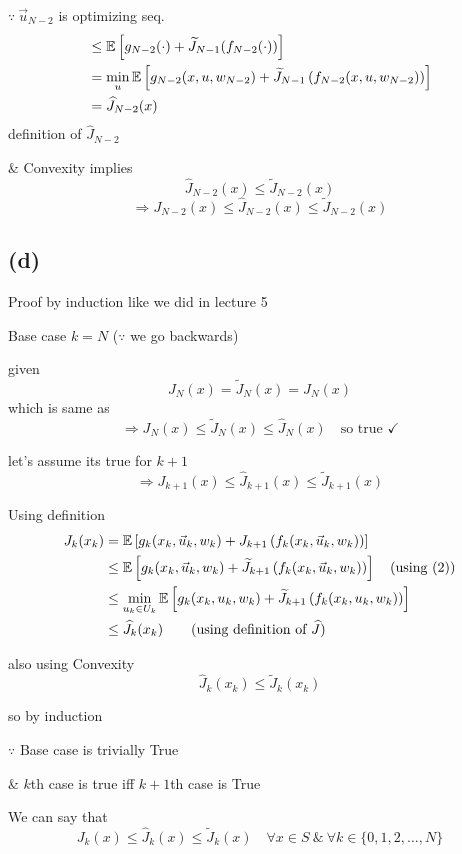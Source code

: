 $\because\ \vec u_{N-2}$ is optimizing seq.
\begin{align*}
&\le\mathbb{E}\left[g_{N-2}(\cdot)+\widetilde J_{N-1}(f_{N-2}(\cdot))\right]\\
&=\min_u\mathbb{E}\left[g_{N-2}(x,u,w_{N-2})
+\widetilde J_{N-1}\left(f_{N-2}(x,u,w_{N-2})\right)\right]\\
&=\widehat J_{N-2}(x)
\end{align*}
\hfill definition of $\widehat J_{N-2}$

\& Convexity implies
\[
\widehat J_{N-2}(x)\le\widetilde J_{N-2}(x)
\]
\[
\Rightarrow\boxed{J_{N-2}(x)\le\widehat J_{N-2}(x)\le\widetilde J_{N-2}(x)}
\]

\subsection*{(d)}
Proof by induction like we did in lecture 5

Base case $k=N$ ($\because$ we go backwards)

given
\[
J_N(x)=\widetilde J_N(x)=\widehat J_N(x)
\]
which is same as
\[
\Rightarrow J_N(x)\le\widetilde J_N(x)\le\widehat J_N(x)\quad\text{so true }\checkmark
\]

let's assume its true for $k+1$
\[
\Rightarrow J_{k+1}(x)\le\widehat J_{k+1}(x)\le\widetilde J_{k+1}(x)\tag{2}
\]

Using definition
\begin{align*}
J_k(x_k)&=\mathbb{E}\left[g_k(x_k,\vec u_k,w_k)
+J_{k+1}\left(f_k(x_k,\vec u_k,w_k)\right)\right]\\
&\le\mathbb{E}\left[g_k(x_k,\vec u_k,w_k)
+\widetilde J_{k+1}\left(f_k(x_k,\vec u_k,w_k)\right)\right]
\quad\text{(using (2))}\\
&\le\min_{u_k\in U_k}\mathbb{E}\left[g_k(x_k,u_k,w_k)
+\widetilde J_{k+1}\left(f_k(x_k,u_k,w_k)\right)\right]\\
&\le\widehat J_k(x_k)\qquad\text{(using definition of }\widehat J\text{)}
\end{align*}

also using Convexity
\[
\widehat J_k(x_k)\le\widetilde J_k(x_k)
\]

so by induction

$\because$ Base case is trivially True

\& $k$th case is true iff $k+1$th case is True

We can say that
\[
\boxed{J_k(x)\le\widehat J_k(x)\le\widetilde J_k(x)}
\quad\forall x\in S\ \&\ \forall k\in\{0,1,2,\ldots,N\}
\]
\endgroup
